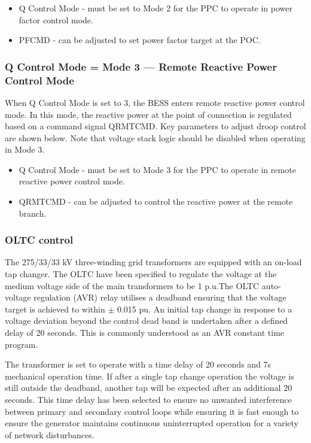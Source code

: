 \documentclass{../grid-link-report}
\begin{document}
		\begin{itemize}
			\item Q Control Mode - must be set to Mode 2 for the PPC to operate in power factor control mode.
			\item PFCMD - can be adjusted to set power factor target at the POC.
		\end{itemize} 
		
		\subsubsection{Q Control Mode = Mode 3 — Remote Reactive Power Control Mode}
		
		When Q Control Mode is set to 3, the BESS enters remote reactive power control mode. In this mode, the reactive power at the point of connection is regulated based on a command signal QRMTCMD. Key parameters to adjust droop control are shown below. Note that voltage stack logic should be disabled when operating in Mode 3.
		
		\begin{itemize}
			\item Q Control Mode - must be set to Mode 3 for the PPC to operate in remote reactive power control mode.
			\item QRMTCMD - can be adjusted to control the reactive power at the remote branch.
		\end{itemize}
		
		\subsubsection{OLTC control}

		The 275/33/33 kV three-winding grid transformers are equipped with an on-load tap changer. The \ac{OLTC} have been specified to regulate the voltage at the medium voltage side of the main transformers to be 1 p.u.The OLTC auto-voltage regulation (AVR) relay utilises a deadband ensuring that the voltage target is achieved to within $\pm$ 0.015 pu. An initial tap change in response to a voltage deviation beyond the control dead band is undertaken after a defined delay of 20 seconds. This is commonly understood as an AVR constant time program. 
		
		The transformer is set to operate with a time delay of 20 seconds and 7s mechanical operation time. If after a single tap change operation the voltage is still outside the deadband, another tap will be expected after an additional 20 seconds. This time delay has been selected to ensure no unwanted interference between primary and secondary control loops while ensuring it is fast enough to ensure the generator maintains continuous uninterrupted operation for a variety of network disturbances.
		
\end{document}
